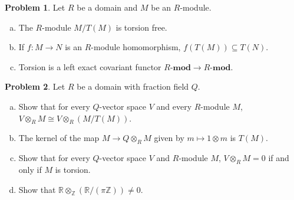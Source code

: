 \documentclass[11pt]{article}
\theoremstyle{definition}
\newtheorem{problem}{Problem}
\begin{document}
\vspace{2em}

\noindent
{} 

\vfill


\begin{problem} Let $R$ be a domain and $M$ be an $R$-module.
	\begin{enumerate}[a)]
		\item The $R$-module $M/T(M)$ is torsion free.
		\item If $f\!: M \longrightarrow N$ is an $R$-module homomorphism, $f(T(M)) \subseteq T(N)$.
		\item Torsion is a left exact covariant functor $R\textbf{-mod} \longrightarrow R\textbf{-mod}$.
	\end{enumerate}
\end{problem}

\vfill

\begin{problem}
	Let $R$ be a domain with fraction field $Q$.
	\begin{enumerate}[a)]
		\item Show that for every $Q$-vector space $V$ and every $R$-module $M$, $V \otimes_R M \cong V \otimes_R (M/T(M))$.
		\item The kernel of the map $M \longrightarrow Q \otimes_R M$ given by $m \mapsto 1 \otimes m$ is $T(M)$.		
		\item Show that for every $Q$-vector space $V$ and $R$-module $M$, $V \otimes_R M = 0$ if and only if $M$ is torsion.
		\item Show that $\mathbb{R} \otimes_\mathbb{Z} (\mathbb{R} / (\pi \mathbb{Z})) \neq 0$.
	\end{enumerate}
\end{problem}



\newpage
\end{document}
